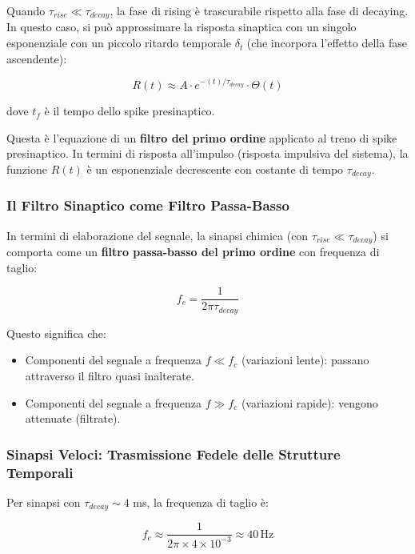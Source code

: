 Quando $\tau_{rise} \ll \tau_{decay}$, la fase di rising è trascurabile rispetto alla fase di decaying. In questo caso, si può approssimare la risposta sinaptica con un singolo esponenziale con un piccolo ritardo temporale $\delta_t$ (che incorpora l'effetto della fase ascendente):

\begin{equation}
R(t) \approx A \cdot e^{-(t )/\tau_{decay}} \cdot \Theta(t)
\end{equation}

dove $t_f$ è il tempo dello spike presinaptico.

Questa è l'equazione di un \textbf{filtro del primo ordine} applicato al treno di spike presinaptico. In termini di risposta all'impulso (risposta impulsiva del sistema), la funzione $R(t)$ è un esponenziale decrescente con costante di tempo $\tau_{decay}$.

\subsubsection{Il Filtro Sinaptico come Filtro Passa-Basso}

In termini di elaborazione del segnale, la sinapsi chimica (con $\tau_{rise} \ll \tau_{decay}$) si comporta come un \textbf{filtro passa-basso del primo ordine} con frequenza di taglio:

\begin{equation}
f_c = \frac{1}{2\pi \tau_{decay}}
\end{equation}

Questo significa che:
\begin{itemize}
    \item Componenti del segnale a frequenza $f \ll f_c$ (variazioni lente): passano attraverso il filtro quasi inalterate.
    \item Componenti del segnale a frequenza $f \gg f_c$ (variazioni rapide): vengono attenuate (filtrate).
\end{itemize}

\subsubsection{Sinapsi Veloci: Trasmissione Fedele delle Strutture Temporali}

Per sinapsi con $\tau_{decay} \sim 4$ ms, la frequenza di taglio è:

\begin{equation}
f_c \approx \frac{1}{2\pi \times 4 \times 10^{-3}} \approx 40 \, \text{Hz}
\end{equation}

